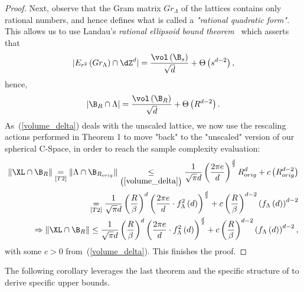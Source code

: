 \begin{proof}
  
  Next, observe that the Gram matrix $Gr_\Lambda$ of the lattices \Lattices contains only rational numbers, and hence defines what is called a \emph{"rational quadratic form"}. This allows us to use Landau's \emph{rational ellipsoid bound theorem}~\cite{ivic2004lattice} which asserts that
  \begin{equation*}
      |E_{r^2}\left(Gr_\Lambda\right)\cap \dZ^d|=\frac{\vol\left(\B_{s}\right)}{\sqrt{d}}+\Theta\left(s^{d-2}\right),
  \end{equation*}
hence,
\begin{align}\label{volume_delta}
    |\B_R\cap \Lambda|=\frac{\vol\left(\B_{R}\right)}{\sqrt{d}}+\Theta\left(R^{d-2}\right).
\end{align}
As~(\ref{volume_delta}) deals with the unscaled lattice, we now use the rescaling actions performed in Theorem 1 to move "back" to the "unscaled" version of our spherical C-Space, in order to reach the sample complexity evaluation:
\begin{align}
    \|\XL\cap \B_R\|\underset{[T2]}{=}\|\Lambda\cap\B_{R_{orig}}\|\underset{\left(\ref{volume_delta}\right)}{\leq}\frac{1}{\sqrt{\pi}d}\left(\frac{2\pi e}{d}\right)^{\frac{d}{2}}R_{orig}^d+c\left(R_{orig}^{d-2}\right) \nonumber\\
    \underset{[T2]}{=}\frac{1}{\sqrt{\pi}d}\left(\frac{R}{\beta}\right)^d\left(\frac{2\pi e}{d}\cdot f_\Lambda^2\left(d\right)\right)^{\frac{d}{2}} +  c\left(\frac{R}{\beta}\right)^{d-2}\left(f_\Lambda\left(d\right)\right)^{d-2} \nonumber\\
    \Rightarrow \|\XL\cap \B_R\| \leq \frac{1}{\sqrt{\pi}d}\left(\frac{R}{\beta}\right)^d\left(\frac{2\pi e}{d}\cdot f_\Lambda^2\left(d\right)\right)^{\frac{d}{2}} +  c\left(\frac{R}{\beta}\right)^{d-2}\left(f_\Lambda\left(d\right)\right)^{d-2},
\end{align}
with some $c>0$ from~(\ref{volume_delta}). This finishes the proof.  
\end{proof}

The following corollary leverages the last theorem and the specific structure of \Lattices to derive specific upper bounds.

